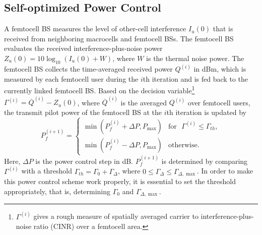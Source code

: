 \documentclass[draftclsnofoot,12pt,onecolumn]{IEEEtran}
\begin{document}
\subsection{Self-optimized Power Control}
A femtocell BS measures the level of other-cell interference
$I_u(0)$ that is received from neighboring macrocells and femtocell
BSs. The femtocell BS evaluates the received interference-plus-noise
power $Z_u(0)=10\log_{10}(I_u(0)+W)$, where $W$ is the thermal noise
power. The femtocell BS collects the time-averaged received power
$Q^{(i)}$ in dBm, which is measured by each femtocell user during
the $i$th iteration and is fed back to the currently linked
femtocell BS.
Based on the decision variable\footnote{$\Gamma^{(i)}$ gives a rough measure of spatially averaged carrier to
interference-plus-noise ratio (CINR) over a femtocell area.}
$\Gamma^{(i)}=\overline{Q}^{(i)}-Z_u(0)$, where $\overline{Q}^{(i)}$
is the averaged $Q^{(i)}$ over femtocell users, the transmit pilot
power of the femtocell BS at the $i$th iteration is updated by
\begin{equation}
P_f^{(i+1)}=\left\{
                     \begin{array}{ll}
                       \min\left(P_f^{(i)}+\Delta P,P_{\max}\right) & \textrm{for~~}  \Gamma^{(i)}\leq\Gamma_{th}, \\
                       \min\left(P_f^{(i)}-\Delta P,P_{\max}\right) & \textrm{otherwise}.
                     \end{array}
                     \right.
                     \label{eq:Update1}
\end{equation}
Here, $\Delta P$ is the power control step in dB. $P_f^{(i+1)}$ is
determined by comparing $\Gamma^{(i)}$ with a threshold
$\Gamma_{th}=\Gamma_{0}+\Gamma_{\Delta}$, where $0\leq
\Gamma_{\Delta} \leq\Gamma_{\Delta,\max}$. In order to make this
power control scheme work properly, it is essential to set the
threshold appropriately, that is, determining $\Gamma_{0}$ and
$\Gamma_{\Delta,\max}$.
\end{document}
